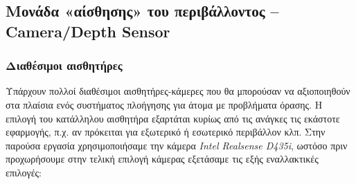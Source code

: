 \subsection{Μονάδα «αίσθησης» του περιβάλλοντος – Camera/Depth Sensor}
\subsubsection{Διαθέσιμοι αισθητήρες}
Υπάρχουν πολλοί διαθέσιμοι αισθητήρες-κάμερες που θα μπορούσαν να αξιοποιηθούν στα πλαίσια ενός συστήματος πλοήγησης για άτομα με προβλήματα όρασης. Η επιλογή του κατάλληλου αισθητήρα εξαρτάται κυρίως από τις ανάγκες τις εκάστοτε εφαρμογής, π.χ. αν πρόκειται για εξωτερικό ή εσωτερικό περιβάλλον κλπ. Στην παρούσα εργασία χρησιμοποιήσαμε την κάμερα \emph{Intel Realsense D435i}, ωστόσο πριν προχωρήσουμε στην τελική επιλογή κάμερας εξετάσαμε τις εξής εναλλακτικές επιλογές:
